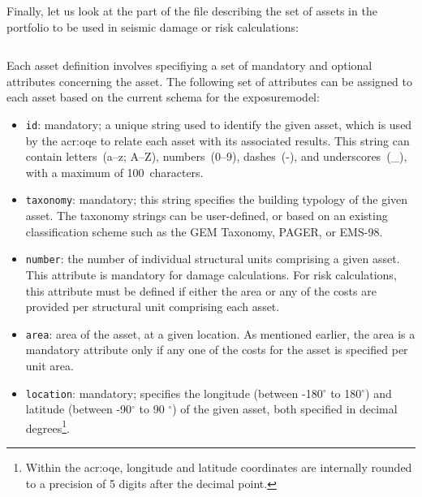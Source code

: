 Finally, let us look at the part of the file describing the set of
\glspl{asset} in the portfolio to be used in seismic damage or risk
calculations:

\inputminted[firstline=17,firstnumber=17,lastline=27,fontsize=\footnotesize,frame=single,linenos,bgcolor=lightgray]{xml}{oqum/risk/Verbatim/input_exposure_minimal.xml}

Each \gls{asset} definition involves specifiying a set of mandatory and
optional attributes concerning the \gls{asset}. The following set of
attributes can be assigned to each \gls{asset} based on the current schema for
the \gls{exposuremodel}:

\begin{itemize}

  \item \Verb+id+: mandatory; a unique string used to identify the 
    given \gls{asset}, which is used by the \glsdesc{acr:oqe} to relate each
    \gls{asset} with its associated results. This string can contain 
    letters~(a--z; A--Z), numbers~(0--9), dashes~(-), and underscores~(\_), 
    with a maximum of 100~characters.

  \item \Verb+taxonomy+: mandatory; this string specifies the building typology
    of the given \gls{asset}. The taxonomy strings can be user-defined, or
    based on an existing classification scheme such as the GEM Taxonomy, PAGER,
    or EMS-98.

  \item \Verb+number+: the number of individual structural units comprising a
    given \gls{asset}. This attribute is mandatory for damage calculations. For
    risk calculations, this attribute must be defined if either the area or any
    of the costs are provided per structural unit comprising each \gls{asset}.

  \item \Verb+area+: area of the \gls{asset}, at a given location. As 
    mentioned earlier, the area is a mandatory attribute only if any one of the 
    costs for the \gls{asset} is specified per unit area.

  \item \Verb+location+: mandatory; specifies the longitude 
    (between -180$^{\circ}$ to 180$^{\circ}$) and latitude 
    (between -90$^{\circ}$ to 90 $^{\circ}$) of the given \gls{asset}, both
    specified in decimal degrees\footnote{Within the \glsdesc{acr:oqe}, 
    longitude and latitude coordinates are internally rounded to a precision
    of 5 digits after the decimal point.}.


\end{itemize}
